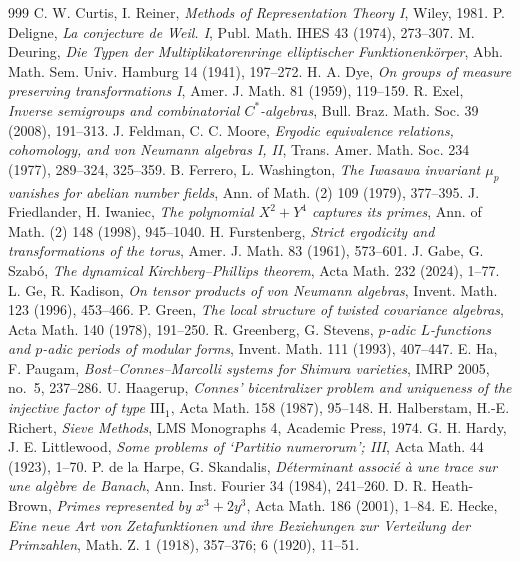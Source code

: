 \begin{thebibliography}{999}
 C. W. Curtis, I. Reiner, \emph{Methods of Representation Theory I}, Wiley, 1981.
 P. Deligne, \emph{La conjecture de Weil. I}, Publ. Math. IHES 43 (1974), 273--307.
 M. Deuring, \emph{Die Typen der Multiplikatorenringe elliptischer Funktionenk\"orper}, Abh. Math. Sem. Univ. Hamburg 14 (1941), 197--272.
 H. A. Dye, \emph{On groups of measure preserving transformations I}, Amer. J. Math. 81 (1959), 119--159.
 R. Exel, \emph{Inverse semigroups and combinatorial $C^*$-algebras}, Bull. Braz. Math. Soc. 39 (2008), 191--313.
 J. Feldman, C. C. Moore, \emph{Ergodic equivalence relations, cohomology, and von Neumann algebras I, II}, Trans. Amer. Math. Soc. 234 (1977), 289--324, 325--359.
 B. Ferrero, L. Washington, \emph{The Iwasawa invariant $\mu_p$ vanishes for abelian number fields}, Ann. of Math. (2) 109 (1979), 377--395.
 J. Friedlander, H. Iwaniec, \emph{The polynomial $X^2+Y^4$ captures its primes}, Ann. of Math. (2) 148 (1998), 945--1040.
 H. Furstenberg, \emph{Strict ergodicity and transformations of the torus}, Amer. J. Math. 83 (1961), 573--601.
 J. Gabe, G. Szab\'o, \emph{The dynamical Kirchberg--Phillips theorem}, Acta Math. 232 (2024), 1--77.
 L. Ge, R. Kadison, \emph{On tensor products of von Neumann algebras}, Invent. Math. 123 (1996), 453--466.
 P. Green, \emph{The local structure of twisted covariance algebras}, Acta Math. 140 (1978), 191--250.
 R. Greenberg, G. Stevens, \emph{$p$-adic $L$-functions and $p$-adic periods of modular forms}, Invent. Math. 111 (1993), 407--447.
 E. Ha, F. Paugam, \emph{Bost--Connes--Marcolli systems for Shimura varieties}, IMRP 2005, no.~5, 237--286.
 U. Haagerup, \emph{Connes' bicentralizer problem and uniqueness of the injective factor of type $\mathrm{III}_1$}, Acta Math. 158 (1987), 95--148.
 H. Halberstam, H.-E. Richert, \emph{Sieve Methods}, LMS Monographs 4, Academic Press, 1974.
 G. H. Hardy, J. E. Littlewood, \emph{Some problems of `Partitio numerorum'; III}, Acta Math. 44 (1923), 1--70.
 P. de la Harpe, G. Skandalis, \emph{D\'eterminant associ\'e \`a une trace sur une alg\`ebre de Banach}, Ann. Inst. Fourier 34 (1984), 241--260.
 D. R. Heath-Brown, \emph{Primes represented by $x^3+2y^3$}, Acta Math. 186 (2001), 1--84.
 E. Hecke, \emph{Eine neue Art von Zetafunktionen und ihre Beziehungen zur Verteilung der Primzahlen}, Math. Z. 1 (1918), 357--376; 6 (1920), 11--51.

\end{thebibliography}
